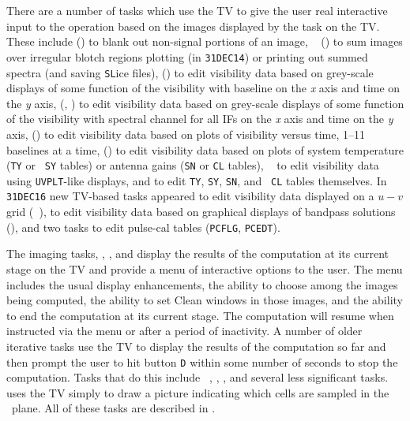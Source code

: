      There are a number of tasks which use the TV to give the user
real interactive input to the operation based on the images displayed
by the task on the TV\@.  These include {\tt {}}
() to blank out non-signal portions of an image, {\tt
{}} () to sum images over irregular blotch
regions plotting (in {\tt 31DEC14}) or printing out summed spectra
(and saving {\tt SL}ice files), {\tt {}} () to
edit visibility data based on grey-scale displays of some function of
the visibility with baseline on the {\it x\/} axis and time on the
{\it y\/} axis, {\tt {}} (, ) to
edit visibility data based on grey-scale displays of some function of
the visibility with spectral channel for all IFs on the {\it x\/} axis
and time on the {\it y\/} axis, {\tt {}} () to
edit visibility data based on plots of visibility versus time, 1--11
baselines at a time, {\tt {}} () to edit
visibility data based on plots of system temperature ({\tt TY} or {\tt
SY} tables) or antenna gains ({\tt SN} or {\tt CL} tables), {\tt
{}} to edit visibility data using {\tt UVPLT}-like displays,
and {\tt {}} to edit {\tt TY}, {\tt SY}, {\tt SN}, and {\tt
CL} tables themselves.  In {\tt 31DEC16} new TV-based tasks appeared
to edit visibility data displayed on a $u-v$ grid ({\tt
{}}), to edit visibility data based on graphical displays of
bandpass solutions ({\tt {}}), and two tasks to edit
pulse-cal tables ({\tt PCFLG}, {\tt PCEDT})\@.

     The imaging tasks, {\tt {}}, {\tt {}}, and
{\tt {}} display the results of the computation at its
current stage on the TV and provide a menu of interactive options to
the user.  The menu includes the usual display enhancements, the
ability to choose among the images being computed, the ability to set
Clean windows in those images, and the ability to end the computation
at its current stage.  The computation will resume when instructed via
the menu or after a period of inactivity.  A number of older iterative
tasks use the TV to display the results of the computation so far and
then prompt the user to hit button {\tt D} within some number of
seconds to stop the computation.  Tasks that do this include {\tt
{}}, {\tt {}}, {\tt {}}, and several
less significant tasks. {\tt {}} uses the TV simply to draw
a picture indicating which cells are sampled in the \uv\ plane.  All
of these tasks are described in .

